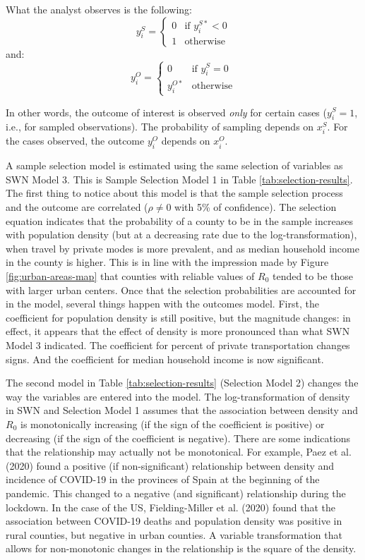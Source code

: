 \documentclass[]{elsarticle} %
\begin{document}
What the analyst observes is the following: \[
y_i^S =
\begin{cases}
0 & \text{if } y_i^{S*} < 0\\
1 & \text{otherwise}
\end{cases}
\] \noindent and: \[
y_i^O =
\begin{cases}
0 & \text{if } y_i^{S} = 0\\
y_i^{O*} & \text{otherwise}
\end{cases}
\]

In other words, the outcome of interest is observed \emph{only} for
certain cases (\(y_i^S=1\), i.e., for sampled observations). The
probability of sampling depends on \(x_i^S\). For the cases observed,
the outcome \(y_i^O\) depends on \(x_i^O\).

A sample selection model is estimated using the same selection of
variables as SWN Model 3. This is Sample Selection Model 1 in Table
\ref{tab:selection-results}. The first thing to notice about this model
is that the sample selection process and the outcome are correlated
(\(\rho\ne0\) with 5\% of confidence). The selection equation indicates
that the probability of a county to be in the sample increases with
population density (but at a decreasing rate due to the
log-transformation), when travel by private modes is more prevalent, and
as median household income in the county is higher. This is in line with
the impression made by Figure \ref{fig:urban-areas-map} that counties
with reliable values of \(R_0\) tended to be those with larger urban
centers. Once that the selection probabilities are accounted for in the
model, several things happen with the outcomes model. First, the
coefficient for population density is still positive, but the magnitude
changes: in effect, it appears that the effect of density is more
pronounced than what SWN Model 3 indicated. The coefficient for percent
of private transportation changes signs. And the coefficient for median
household income is now significant.

The second model in Table \ref{tab:selection-results} (Selection Model
2) changes the way the variables are entered into the model. The
log-transformation of density in SWN and Selection Model 1 assumes that
the association between density and \(R_0\) is monotonically increasing
(if the sign of the coefficient is positive) or decreasing (if the sign
of the coefficient is negative). There are some indications that the
relationship may actually not be monotonical. For example, Paez et al.
(2020) found a positive (if non-significant) relationship between
density and incidence of COVID-19 in the provinces of Spain at the
beginning of the pandemic. This changed to a negative (and significant)
relationship during the lockdown. In the case of the US, Fielding-Miller
et al. (2020) found that the association between COVID-19 deaths and
population density was positive in rural counties, but negative in urban
counties. A variable transformation that allows for non-monotonic
changes in the relationship is the square of the density.
\end{document}
